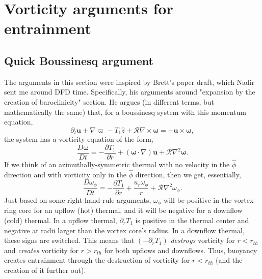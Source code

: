 \documentclass[onecolumn, amsmath, amsfonts, amssymb]{aastex62}
\newcommand{\grad}{\ensuremath{\nabla}}
\begin{document}
\section{Vorticity arguments for entrainment}
\subsection{Quick Boussinesq argument}
The arguments in this section were inspired by Brett's paper draft, which Nadir sent me
around DFD time. Specifically, his arguments around "expansion by the creation of baroclinicity"
section.  He argues (in different terms, but mathematically the same)
that, for a boussinesq system with this momentum equation,
$$
\partial_t \bm{u}  + \grad\varpi - T_1 \hat{z} + \mathcal{R}\grad\times\bm{\omega} = -\bm{u}\times\bm{\omega},
$$
the system has a vorticity equation of the form,
\begin{equation}
\frac{D\bm{\omega}}{Dt} = -\frac{\partial T_1}{\partial r} + (\bm{\omega}\cdot\grad)\bm{u} + \mathcal{R}\grad^2\bm{\omega}.
\end{equation}
If we think of an azimuthally-symmetric thermal with no velocity in the $\hat{\phi}$ direction
and with vorticity only in the $\hat{\phi}$ direction, then we get, essentially,
\begin{equation}
\frac{D\omega_\phi}{Dt} = -\frac{\partial T_1}{\partial r} + \frac{u_r \omega_\phi}{r} + \mathcal{R}\grad^2\omega_\phi.
\end{equation}
Just based on some right-hand-rule arguments, $\omega_\phi$ will be positive in the vortex ring
core for an upflow (hot) thermal, and it will be negative for a downflow (cold) thermal.
In a upflow thermal, $\partial_r T_1$ is positive in the thermal center and negative at radii
larger than the vortex core's radius. In a downflow thermal, these signs are switched. This means
that $(-\partial_r T_1)$ \emph{destroys} vorticity for $r < r_{th}$ and \emph{creates} vorticity
for $r > r_{th}$ for both upflows and downflows. Thus, buoyancy creates entrainment through
the destruction of vorticity for $r < r_{th}$ (and the creation of it further out).
\end{document}
